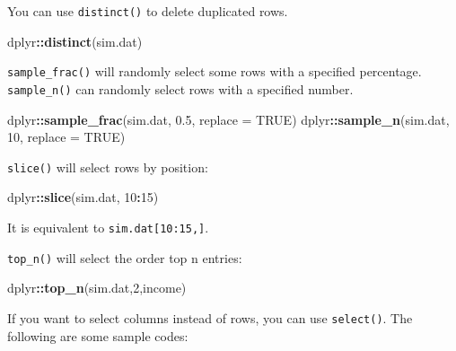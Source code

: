 \documentclass[12pt,]{krantz}
\newenvironment{Shaded}{\begin{snugshade}}{\end{snugshade}}
\newcommand{\KeywordTok}[1]{\textcolor[rgb]{0.13,0.29,0.53}{\textbf{#1}}}
\newcommand{\DataTypeTok}[1]{\textcolor[rgb]{0.13,0.29,0.53}{#1}}
\newcommand{\DecValTok}[1]{\textcolor[rgb]{0.00,0.00,0.81}{#1}}
\newcommand{\FloatTok}[1]{\textcolor[rgb]{0.00,0.00,0.81}{#1}}
\newcommand{\OtherTok}[1]{\textcolor[rgb]{0.56,0.35,0.01}{#1}}
\newcommand{\OperatorTok}[1]{\textcolor[rgb]{0.81,0.36,0.00}{\textbf{#1}}}
\newcommand{\NormalTok}[1]{#1}
\theoremstyle{definition}
\theoremstyle{definition}
\theoremstyle{definition}
\theoremstyle{remark}
\begin{document}
You can use \texttt{distinct()} to delete duplicated rows.

\begin{Shaded}
\begin{Highlighting}[]
\NormalTok{dplyr}\OperatorTok{::}\KeywordTok{distinct}\NormalTok{(sim.dat)}
\end{Highlighting}
\end{Shaded}

\texttt{sample\_frac()} will randomly select some rows with a specified
percentage. \texttt{sample\_n()} can randomly select rows with a
specified number.

\begin{Shaded}
\begin{Highlighting}[]
\NormalTok{dplyr}\OperatorTok{::}\KeywordTok{sample_frac}\NormalTok{(sim.dat, }\FloatTok{0.5}\NormalTok{, }\DataTypeTok{replace =} \OtherTok{TRUE}\NormalTok{) }
\NormalTok{dplyr}\OperatorTok{::}\KeywordTok{sample_n}\NormalTok{(sim.dat, }\DecValTok{10}\NormalTok{, }\DataTypeTok{replace =} \OtherTok{TRUE}\NormalTok{) }
\end{Highlighting}
\end{Shaded}

\texttt{slice()} will select rows by position:

\begin{Shaded}
\begin{Highlighting}[]
\NormalTok{dplyr}\OperatorTok{::}\KeywordTok{slice}\NormalTok{(sim.dat, }\DecValTok{10}\OperatorTok{:}\DecValTok{15}\NormalTok{) }
\end{Highlighting}
\end{Shaded}

It is equivalent to \texttt{sim.dat{[}10:15,{]}}.

\texttt{top\_n()} will select the order top n entries:

\begin{Shaded}
\begin{Highlighting}[]
\NormalTok{dplyr}\OperatorTok{::}\KeywordTok{top_n}\NormalTok{(sim.dat,}\DecValTok{2}\NormalTok{,income)}
\end{Highlighting}
\end{Shaded}

If you want to select columns instead of rows, you can use
\texttt{select()}. The following are some sample codes:
\end{document}
